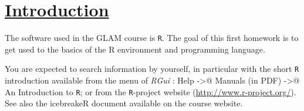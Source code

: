 \documentclass[a4paper,12pt]{article}\usepackage[]{graphicx}\usepackage[]{color}
\begin{document}
%


\begin{center}
\bigskip

\bigskip

\bigskip

\bigskip

\bigskip

\bigskip


\bigskip

\bigskip

\bigskip
\end{center}





\setlength{\parskip}{1ex plus 0.5ex minus 0.2ex}
\parindent=0cm
\setlength{\parskip}{1ex plus 0.5ex minus 0.2ex}
\linespread{1.1}
\sloppy

\section{\underline{Introduction}}

The software used in the GLAM course is \texttt{R}. The goal of this first homework is to get used to the basics of the R environment and programming language.

You are expected to search information by yourself, in particular with the short \texttt{R} introduction available from the menu of
\emph{RGui} : \textsf{Help} \verb@->@ \textsf{Manuals (in PDF)} \verb@->@ \textsf{An Introduction to \texttt{R}}; or from the \texttt{R}-project website (\url{http://www.r-project.org/}). See also the icebreakeR document available on the course website.
\end{document}
